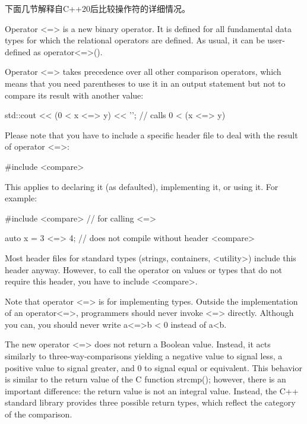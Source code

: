 下面几节解释自C++20后比较操作符的详细情况。


Operator <=> is a new binary operator. It is defined for all fundamental data types for which the relational operators are defined. As usual, it can be user-defined as operator<=>().

Operator <=> takes precedence over all other comparison operators, which means that you need parentheses to use it in an output statement but not to compare its result with another value:

\begin{cpp}
std::cout << (0 < x <=> y) << '\n'; // calls 0 < (x <=> y)
\end{cpp}

Please note that you have to include a specific header file to deal with the result of operator <=>:

\begin{cpp}
#include <compare>
\end{cpp}

This applies to declaring it (as defaulted), implementing it, or using it. For example:

\begin{cpp}
#include <compare> // for calling <=>

auto x = 3 <=> 4; // does not compile without header <compare>
\end{cpp}

Most header files for standard types (strings, containers, <utility>) include this header anyway. However, to call the operator on values or types that do not require this header, you have to include <compare>.

Note that operator <=> is for implementing types. Outside the implementation of an operator<=>, programmers should never invoke <=> directly. Although you can, you should never write a<=>b < 0 instead of a<b.


The new operator <=> does not return a Boolean value. Instead, it acts similarly to three-way-comparisons yielding a negative value to signal less, a positive value to signal greater, and 0 to signal equal or equivalent. This behavior is similar to the return value of the C function strcmp(); however, there is an important difference: the return value is not an integral value. Instead, the C++ standard library provides three possible return types, which reflect the category of the comparison.

